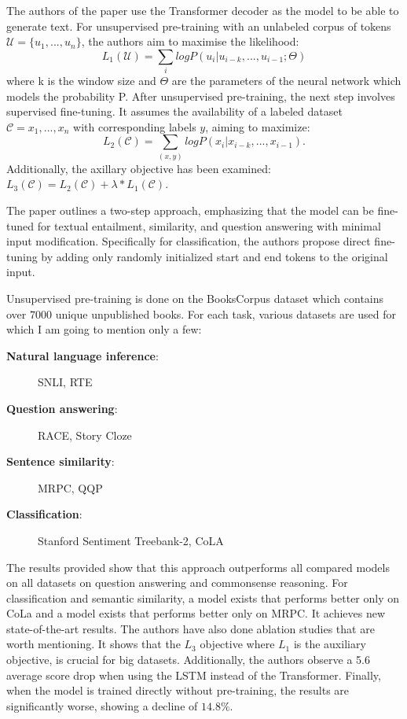 \documentclass[times, utf8, seminar]{fer}
\begin{document}
The authors of the paper use the Transformer decoder as the model to be able to generate text. For unsupervised pre-training with an unlabeled corpus of tokens $\mathcal{U} = \{u_1,...,u_n\}$, the authors aim to maximise the likelihood:
\begin{equation}
L_1(\mathcal{U}) = \sum_i  log P \left(u_i|u_{i-k},...,u_{i-1};\Theta\right)
\label{eq:unsupervised_pretraining}
\end{equation}
where k is the window size and $\Theta$ are the parameters of the neural network which models the probability P. After unsupervised pre-training, the next step involves supervised fine-tuning. It assumes the availability of a labeled dataset $\mathcal{C} = {x_1, ..., x_n}$ with corresponding labels $y$, aiming to maximize:
\begin{equation}
L_2(\mathcal{C}) = \sum_{(x, y)}  log P \left(x_i|x_{i-k},...,x_{i-1}\right).
\label{eq:supervised_finetuning}
\end{equation}
Additionally, the axillary objective has been examined: $L_3(\mathcal{C}) = L_2(\mathcal{C}) + \lambda * L_1(\mathcal{C})$.

The paper outlines a two-step approach, emphasizing that the model can be fine-tuned for textual entailment, similarity, and question answering with minimal input modification. Specifically for classification, the authors propose direct fine-tuning by adding only randomly initialized start and end tokens to the original input.


Unsupervised pre-training is done on the BooksCorpus dataset \citep{zhu2015aligning} which contains over $7000$ unique unpublished books. For each task, various datasets are used for which I am going to mention only a few:
\begin{description}
    \item [\textbf{Natural language inference}:] SNLI\citep{bowman2015large}, RTE\citep{bentivogli2009fifth}
    \item [\textbf{Question answering}:] RACE\citep{lai2017race}, Story Cloze\citep{mostafazadeh2017lsdsem}
    \item [\textbf{Sentence similarity}:] MRPC\citep{dolan2005automatically}, QQP\citep{quoraquestion}
    \item [\textbf{Classification}:] Stanford Sentiment Treebank-2\citep{socher2013recursive}, CoLA \citep{warstadt2018corpus}
\end{description}


The results provided show that this approach outperforms all compared models on all datasets on question answering and commonsense reasoning. For classification and semantic similarity, a model exists that performs better only on CoLa and a model exists that performs better only on MRPC. It achieves new state-of-the-art results. The authors have also done ablation studies that are worth mentioning. It shows that the $L_3$ objective where $L_1$ is the auxiliary objective, is crucial for big datasets. Additionally, the authors observe a 5.6 average score drop when using the LSTM instead of the Transformer. Finally, when the model is trained directly without pre-training, the results are significantly worse, showing a decline of $14.8\%$.
\end{document}
